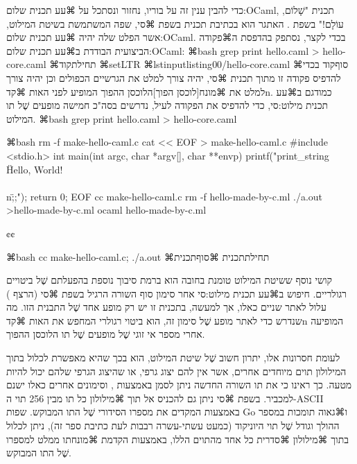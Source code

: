 כדי להבין ענין זה על בוריו, נחזור ונסתכל על ⌘עע תכנית שלום:OCaml, תכנית
"שָׁלוֹם, עוֹלָם!" בשפת . האתגר הוא בכתיבת תכנית בשפת ⌘סי, שפה המשתמשת
בשיטת המילוט, אשר הפלט שלה יהיה ⌘עע תכנית שלום:OCaml. בכדי לקצר, נסתפק בהדפסת
ה⌘פקודה הביצועית הבודדת ב⌘עע תכנית שלום:OCaml{}:
⌘bash
grep print hello.caml > hello-core.caml
\END
⌘תחילת{קוד}
⌘setLTR
\lstset{language=[Objective]Caml,style=display}
⌘lstinputlisting{00/hello-core.caml}
⌘סוף{קוד}
בכדי להדפיס פקודה זו מתוך תכנית ⌘סי, יהיה צורך למלט את הגרשיים הכפולים וכן
יהיה צורך למלט את ⌘מונח[לוכסן הפוך]{הלוכסן ההפוך} המופיע לפני האות ⌘קד{n}.
כמודגם ב⌘עע תכנית מילוט:סי, כדי להדפיס את הפקודה לעיל, נדרשים בסה"כ חמישה
מופעים שֶׁל תו המילוט.
⌘bash
grep print hello.caml > hello-core.caml
\END

⌘bash
rm -f make-hello-caml.c
cat << EOF > make-hello-caml.c
#include <stdio.h>
int main(int argc, char *argv[], char **envp) {
  printf("print_string \"Hello, World!\\\\n\";;\n");
  return 0;
}
EOF
cc make-hello-caml.c
rm -f hello-made-by-c.ml
./a.out >hello-made-by-c.ml
ocaml hello-made-by-c.ml
\END

{¢¢
\setLTR

}

⌘bash
cc make-hello-caml.c; ./a.out
\END
⌘תחילת{תכנית}
\bashStdout
{}
⌘סוף{תכנית}

קושי נוסף ששיטת המילוט טומנת בחובה הוא ברמת סיבוך נוספת בהפעלתם שֶׁל ביטויים
רגולריים. חיפוש ב⌘עע תכנית מילוט:סי אחר סימון סוף השורה הרגיל בשפת ⌘סי (הרצף
{\let\ttfamily=\listingsfont\RL{\verb+\n+}}) עלול לאתר שניים כאלו, אך למעשה,
בתכנית זו יש רק מופע אחד שֶׁל התבנית הזו. מה שנדרש כדי לאתר מופע שֶׁל סימון זה,
הוא ביטוי רגולרי המחפש את האות ⌘קד{n} המופיעה אחרי מספר אי זוגי שֶׁל מופעים שֶׁל
תו הלוכסן ההפוך.

לעומת חסרונות אלו, יתרון חשוב שֶׁל שיטת המילוט, הוא בכך שהיא מאפשרת לכלול
בתוך המילולון תוים מיוחדים אחרים, אשר אין להם יצוג גרפי, או שהיצוג הגרפי
שלהם יכול להיות מטעה. כך ראינו כי את תו השורה החדשה ניתן לסמן באמצעות
{\let\ttfamily=\listingsfont\RL{\verb+\n+}},
וסימונים אחרים כאלו
ישנם למכביר. בשפת ⌘סי ניתן גם להכניס אל תוך ⌘מילולון כל תו מבין 256 תוי
ה-ASCII באמצעות  המקדים את מספרו הסידורי שֶׁל התו המבוקש. שפות
Go ו⌘גאוה תומכות במספר ההולך וגודל שֶׁל תוי היוניקוד (כמעט עשתי-עשרה רבבות לעת
כתיבת ספר זה), ניתן לכלול בתוך ⌘מילולון ⌘סדרית כל אחד מהתוים הללו, באמצעות
הקדמת ⌘מונח{תו ממלט} למספרו שֶׁל התו המבוקש.

